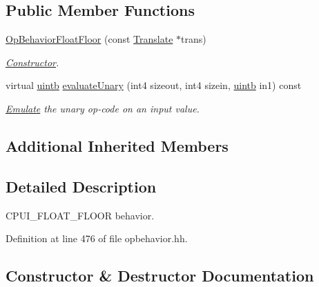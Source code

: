 \subsection*{Public Member Functions}
\begin{DoxyCompactItemize}
\item 
\mbox{\hyperlink{class_op_behavior_float_floor_a940248c9e5e4f904941c93a084ac1cf7}{Op\+Behavior\+Float\+Floor}} (const \mbox{\hyperlink{class_translate}{Translate}} $\ast$trans)
\begin{DoxyCompactList}\small\item\em \mbox{\hyperlink{class_constructor}{Constructor}}. \end{DoxyCompactList}\item 
virtual \mbox{\hyperlink{types_8h_a2db313c5d32a12b01d26ac9b3bca178f}{uintb}} \mbox{\hyperlink{class_op_behavior_float_floor_adbb7f5d89cfeb64ce9319c1fc81955fa}{evaluate\+Unary}} (int4 sizeout, int4 sizein, \mbox{\hyperlink{types_8h_a2db313c5d32a12b01d26ac9b3bca178f}{uintb}} in1) const
\begin{DoxyCompactList}\small\item\em \mbox{\hyperlink{class_emulate}{Emulate}} the unary op-\/code on an input value. \end{DoxyCompactList}\end{DoxyCompactItemize}
\subsection*{Additional Inherited Members}


\subsection{Detailed Description}
C\+P\+U\+I\+\_\+\+F\+L\+O\+A\+T\+\_\+\+F\+L\+O\+OR behavior. 

Definition at line 476 of file opbehavior.\+hh.



\subsection{Constructor \& Destructor Documentation}
\mbox{\label{class_op_behavior_float_floor_a940248c9e5e4f904941c93a084ac1cf7}} 
